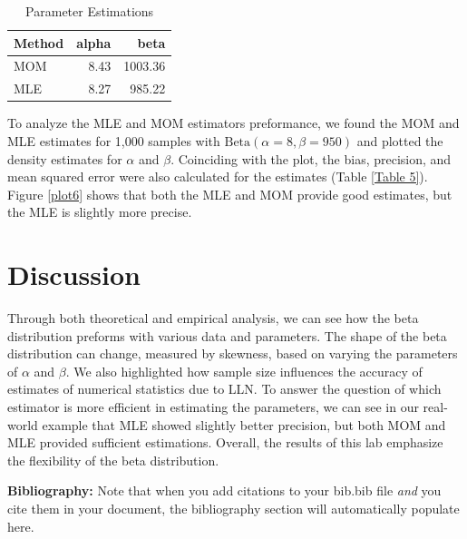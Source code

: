 \documentclass{article}\usepackage[]{graphicx}\usepackage[]{xcolor}
\begin{document}
\begin{multicols}{2}
\begin{table}[H]
\centering
\begingroup\small
\begin{tabular}{lrr}
  \hline
Method & alpha & beta \\ 
  \hline
MOM & 8.43 & 1003.36 \\ 
  MLE & 8.27 & 985.22 \\ 
   \hline
\end{tabular}
\endgroup
\caption{Parameter Estimations} 
\label{Table 4}
\end{table}

To analyze the MLE and MOM estimators preformance, we found the MOM and MLE estimates for 1,000 samples with \(\text{Beta}(\alpha = 8, \beta = 950)\) and plotted the density estimates for \(\alpha\) and \(\beta\). Coinciding with the plot, the bias, precision, and mean squared error were also calculated for the estimates (Table \ref{Table 5}). Figure \ref{plot6} shows that both the MLE and MOM provide good estimates, but the MLE is slightly more precise.  

\section{Discussion}
Through both theoretical and empirical analysis, we can see how the beta distribution preforms with various data and parameters. The shape of the beta distribution can change, measured by skewness, based on varying the parameters of \(\alpha\) and \(\beta\). We also highlighted how sample size influences the accuracy of estimates of numerical statistics due to LLN. To answer the question of which estimator is more efficient in estimating the parameters, we can see in our real-world example that MLE showed slightly better precision, but both MOM and MLE provided sufficient estimations. Overall, the results of this lab emphasize the flexibility of the beta distribution.

\vspace{2em}

\noindent\textbf{Bibliography:} Note that when you add citations to your bib.bib file \emph{and}
you cite them in your document, the bibliography section will automatically populate here.

\begin{tiny}

\end{tiny}
\end{multicols}
\end{document}
